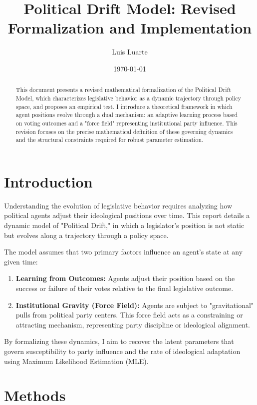 \documentclass{article}
\title{\textbf{Political Drift Model: Revised Formalization and Implementation}}
\author{Luis Luarte}
\date{\today}
\begin{document}
	
	\maketitle
	
	\begin{abstract}
		This document presents a revised mathematical formalization of the Political Drift Model, which characterizes legislative behavior as a dynamic trajectory through policy space, and proposes an empirical test. I introduce a theoretical framework in which agent positions evolve through a dual mechanism: an adaptive learning process based on voting outcomes and a "force field" representing institutional party influence. This revision focuses on the precise mathematical definition of these governing dynamics and the structural constraints required for robust parameter estimation.
	\end{abstract}
	
	\section{Introduction}
	Understanding the evolution of legislative behavior requires analyzing how political agents adjust their ideological positions over time. This report details a dynamic model of "Political Drift," in which a legislator's position is not static but evolves along a trajectory through a policy space.
	
	The model assumes that two primary factors influence an agent's state at any given time:
	\begin{enumerate}
		\item \textbf{Learning from Outcomes:} Agents adjust their position based on the success or failure of their votes relative to the final legislative outcome.
		\item \textbf{Institutional Gravity (Force Field):} Agents are subject to "gravitational" pulls from political party centers. This force field acts as a constraining or attracting mechanism, representing party discipline or ideological alignment.
	\end{enumerate}
	
	By formalizing these dynamics, I aim to recover the latent parameters that govern susceptibility to party influence and the rate of ideological adaptation using Maximum Likelihood Estimation (MLE).
	
	\section{Methods}
	
\end{document}
